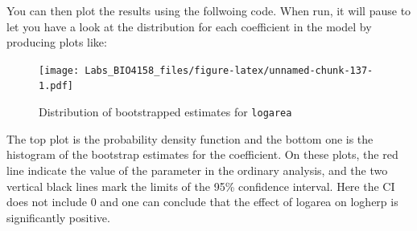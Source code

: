 \documentclass[
  12pt,
]{book}
\newenvironment{Shaded}{\begin{snugshade}}{\end{snugshade}}
\newcommand{\CommentTok}[1]{\textcolor[rgb]{0.56,0.35,0.01}{\textit{#1}}}
\newcommand{\ControlFlowTok}[1]{\textcolor[rgb]{0.13,0.29,0.53}{\textbf{#1}}}
\newcommand{\DataTypeTok}[1]{\textcolor[rgb]{0.13,0.29,0.53}{#1}}
\newcommand{\DecValTok}[1]{\textcolor[rgb]{0.00,0.00,0.81}{#1}}
\newcommand{\FloatTok}[1]{\textcolor[rgb]{0.00,0.00,0.81}{#1}}
\newcommand{\KeywordTok}[1]{\textcolor[rgb]{0.13,0.29,0.53}{\textbf{#1}}}
\newcommand{\NormalTok}[1]{#1}
\newcommand{\OperatorTok}[1]{\textcolor[rgb]{0.81,0.36,0.00}{\textbf{#1}}}
\newcommand{\OtherTok}[1]{\textcolor[rgb]{0.56,0.35,0.01}{#1}}
\newcommand{\StringTok}[1]{\textcolor[rgb]{0.31,0.60,0.02}{#1}}
\begin{document}
You can then plot the results using the follwoing code. When run, it will pause to let you have a look at the distribution for each coefficient in the model by producing plots like:

\begin{Shaded}
\end{Shaded}

\begin{figure}
\centering
\texttt{[image: Labs\_BIO4158\_files/figure-latex/unnamed-chunk-137-1.pdf]}
\caption{\label{fig:unnamed-chunk-137}Distribution of bootstrapped estimates for \texttt{logarea}}
\end{figure}

The top plot is the probability density function and the bottom one is the histogram of the bootstrap estimates for the coefficient. On these plots, the red line indicate the value of the parameter in the ordinary analysis, and the two vertical black lines mark the limits of the 95\% confidence interval. Here the CI does not include 0 and one can conclude that the effect of logarea on logherp is significantly positive.
\end{document}

